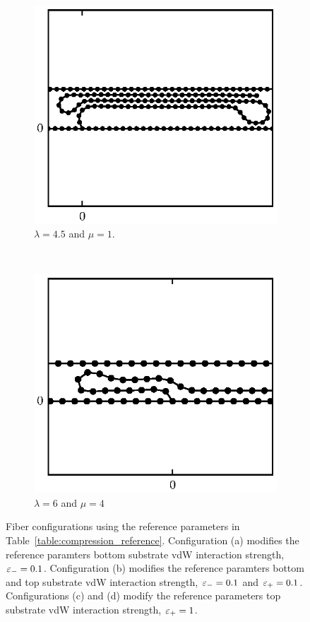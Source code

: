 {\begin{figure}
		\begin{subfigure}{.5\textwidth}
			\centering
			\includegraphics{./fig/ch3/push/et0.1/l4.5_m1.eps}
			\caption{$\lambda=4.5$ and $\mu=1$.\label{subfig:bridge}}
		\end{subfigure}%
		~
		\begin{subfigure}{.5\textwidth}
			\centering
			\includegraphics{./fig/ch3/push/et0.1/l6_m4.eps}
			\caption{$\lambda=6$ and $\mu=4$\label{subfig:hump}}
		\end{subfigure}	
		\caption{Fiber configurations using the reference parameters in Table~\ref{table:compression_reference}. Configuration (a) modifies the reference paramters bottom substrate vdW interaction strength, $\varepsilon_-=0.1$. Configuration (b) modifies the reference paramters bottom and top substrate vdW interaction strength, $\varepsilon_-=0.1$ and $\varepsilon_+=0.1$. Configurations (c) and (d) modify the reference parameters top substrate vdW interaction strength, $\varepsilon_+=1$.\label{fig:vdw_crushed}}	
	\end{figure}

}
